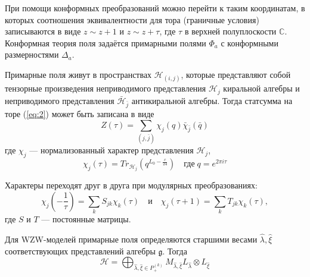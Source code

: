 \documentclass[a4paper,12pt]{article}
\theoremstyle{definition} \newtheorem{Def}{Definition}
\begin{document}
При помощи конформных преобразований можно перейти к таким координатам, в которых соотношения
эквивалентности для тора (граничные условия) записываются в виде $z\sim z+1$ и $z\sim z+\tau$, где $\tau$ в верхней полуплоскости
$\mathbb{C}$.
Конформная теория поля задаётся примарными полями $\Phi_a$ с конформными размерностями $\Delta_a$.

Примарные поля живут в пространствах $\mathcal{H}_{(i,j)}$, которые представляют собой тензорные
произведения неприводимого представления $\mathcal{H}_j$ киральной алгебры и неприводимого
представления $\bar{\mathcal{H}}_{\bar{j}}$ антикиральной алгебры. Тогда статсумма на торе
(\ref{eq:2}) может быть записана в виде
\begin{equation}
  \label{eq:9}
    Z(\tau)=\sum_{(j,\bar j)}\chi_j(q)\bar \chi_{\bar j}(\bar q)
\end{equation}
где $\chi_j$ --- нормализованный характер представления $\mathcal{H}_j$,
\begin{equation}
  \label{eq:5} \chi_j(\tau)=Tr_{\mathcal{H}_j}(q^{L_0-\frac{c}{24}})\quad \mbox{где}\; q=e^{2\pi i
\tau}
\end{equation}

Характеры переходят друг в друга при модулярных преобразованиях:
\begin{equation}
  \label{eq:107} \chi_j\left(-\frac{1}{\tau}\right)=\sum_k S_{jk}\chi_k(\tau)\quad \mbox{и}\quad
\chi_j(\tau+1)=\sum_kT_{jk}\chi_k(\tau),
\end{equation}
где $S$ и $T$ --- постоянные матрицы. 

Для WZW-моделей примарные поля определяются старшими весами  $\hat \lambda, \hat \xi$ соответствующих представлений алгебры $\mathfrak{g}$. Тогда
\begin{equation}
  \label{eq:6} \mathcal{H}=\bigoplus_{\hat \lambda,\hat \xi\in P^{(k)}_{+}}M_{\hat \lambda,\hat \xi}
L_{\hat \lambda}\otimes L_{\hat \xi}
\end{equation}
\end{document}
